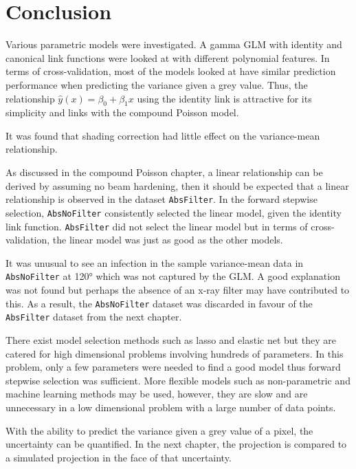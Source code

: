 \section{Conclusion}

Various parametric models were investigated. A gamma GLM with identity and canonical link functions were looked at with different polynomial features. In terms of cross-validation, most of the models looked at have similar prediction performance when predicting the variance given a grey value. Thus, the relationship $\widehat{y}(x)=\beta_0+\beta_1 x$ using the identity link is attractive for its simplicity and links with the compound Poisson model.

It was found that shading correction had little effect on the variance-mean relationship.

As discussed in the compound Poisson chapter, a linear relationship can be derived by assuming no beam hardening, then it should be expected that a linear relationship is observed in the dataset \texttt{AbsFilter}. In the forward stepwise selection, \texttt{AbsNoFilter} consistently selected the linear model, given the identity link function. \texttt{AbsFilter} did not select the linear model but in terms of cross-validation, the linear model was just as good as the other models.

It was unusual to see an infection in the sample variance-mean data in \texttt{AbsNoFilter} at \ang{120} which was not captured by the GLM. A good explanation was not found but perhaps the absence of an x-ray filter may have contributed to this. As a result, the \texttt{AbsNoFilter} dataset was discarded in favour of the \texttt{AbsFilter} dataset from the next chapter.

There exist model selection methods such as lasso and elastic net \citep{tibshirani1996regression, zou2005regularization, friedman2010regularization} but they are catered for high dimensional problems involving hundreds of parameters. In this problem, only a few parameters were needed to find a good model thus forward stepwise selection was sufficient. More flexible models such as non-parametric and machine learning methods may be used, however, they are slow and are unnecessary in a low dimensional problem with a large number of data points.

With the ability to predict the variance given a grey value of a pixel, the uncertainty can be quantified. In the next chapter, the projection is compared to a simulated projection in the face of that uncertainty.
